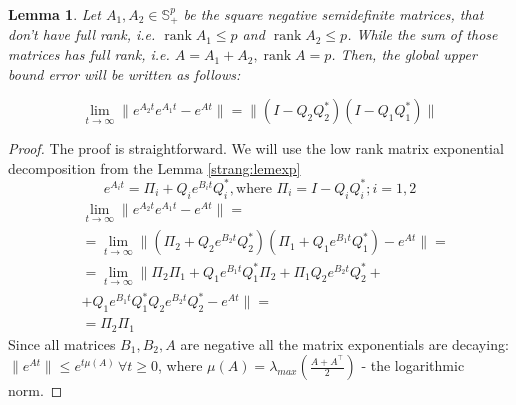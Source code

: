 \documentclass{article}
\newtheorem{lemma}{Lemma}
\begin{document}
\begin{lemma}
	\label{strang:lemupper_2}
	Let $A_1, A_2 \in \mathbb{S}^p_{+}$ be the square negative semidefinite matrices, that don't have full rank, i.e. $\operatorname{rank}{A_1} \leq p$ and $\operatorname{rank}{A_2} \leq p$. While the sum of those matrices has full rank, i.e. $A = A_1 + A_2, \operatorname{rank}{A} = p$. Then, the global upper bound error will be written as follows:

	\begin{equation}\label{strang:lemupper}
		\lim_{t \to \infty}\| e^{A_2t}e^{A_1t} - e^{At}\| = \|(I - Q_2Q_2^*)(I - Q_1Q_1^*)\|
	\end{equation}
\end{lemma}
\begin{proof}
	The proof is straightforward. We will use the low rank matrix exponential decomposition from the Lemma \ref{strang:lemexp}
	$$
	e^{A_it} = \Pi_i + Q_i e^{B_it} Q_i^*, \text{where } \Pi_i = I - Q_iQ_i^*; i = 1,2
	$$
	\begin{align*}
	&\lim_{t \to \infty}\| e^{A_2t}e^{A_1t} - e^{At}\| = \\ 
	&= \lim_{t \to \infty}\| (\Pi_2 + Q_2 e^{B_2t} Q_2^*)(\Pi_1 + Q_1 e^{B_1t} Q_1^*) - e^{At}\| = \\
	&= \lim_{t \to \infty}\| \Pi_2\Pi_1 + Q_1 e^{B_1t} Q_1^*\Pi_2 + \Pi_1Q_2 e^{B_2t} Q_2^* + \\
	&+  Q_1 e^{B_1t} Q_1^* Q_2 e^{B_2t} Q_2^* - e^{At}\| =\\&= \Pi_2 \Pi_1
	\end{align*}
	Since all matrices $B_1, B_2, A$ are negative all the matrix exponentials are decaying: $\|e^{At}\|\leq e^{t\mu (A)}\, \forall t\geq 0$, where $\mu(A) = \lambda_{max} \left( \frac{A + A^\top}{2}\right)$ - the logarithmic norm.
\end{proof}
\end{document}
